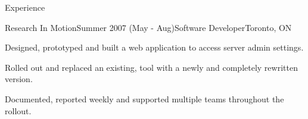 \documentclass{resume}
\begin{document}
\begin{rSection}{Experience}
    \begin{rSubsection}{Research In Motion}{Summer 2007 (May - Aug)}{Software Developer}{Toronto, ON}
      \item Designed, prototyped and built a web application to access server admin settings.
      \item Rolled out and replaced an existing, tool with a newly and completely rewritten version.
      \item Documented, reported weekly and supported multiple teams throughout the rollout.

      \begin{comment}
        \item Designed a prototype and implemented a web application to access administrative settings on a server using SOAP-based HTTP communication
        \item Debugged existing code and tested new code, ensuring the code will work in the future and save the company time and money having to deal with broken code later on
        \item Distributed a new version of a tool for use by multiple teams ensuring everyone involved was using and familiarizing themselves with the latest tools
        \item Provided technical support to product’s users, freeing them up from having to spend time figuring out what they had trouble with and allowing them to spend the time productively
        \item Wrote user friendly instructions on use of the new application, allowing the application to enter use quicker than it otherwise would have taken 
        \item Reported weekly on application status to two development groups, helping them keep on schedule
      \end{comment}
    \end{rSubsection}

  \end{rSection}
\end{document}
